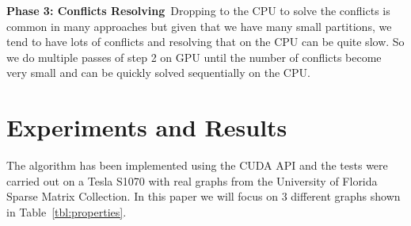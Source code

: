 \documentclass[preprint]{sigplanconf}
\begin{document}
%
%
%


\textbf{Phase 3: Conflicts Resolving}\
Dropping to the CPU to solve the conflicts is common in many approaches but given that we have many small partitions, we tend to have lots of conflicts and resolving that on the CPU can be quite slow. So we do multiple passes of step 2 on GPU until the number of conflicts become very small and can be quickly solved sequentially on the CPU. 


\section{Experiments and Results}
The algorithm has been implemented using the CUDA API and the tests were carried out on a Tesla S1070 with real graphs from the University of Florida Sparse Matrix Collection. In this paper we will focus on 3 different graphs shown in Table~\ref{tbl:properties}.
\end{document}
